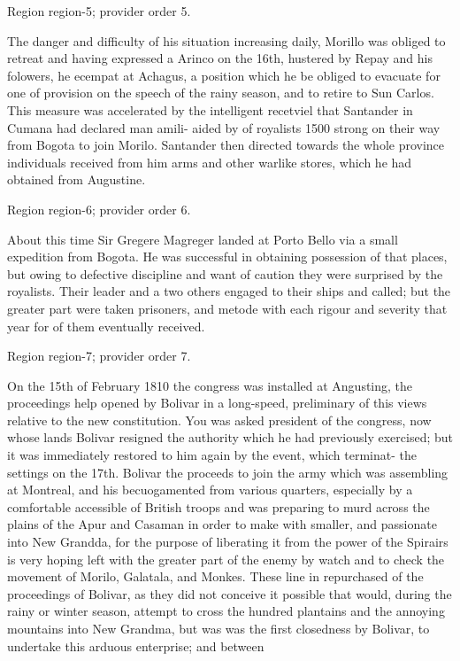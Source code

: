 \documentclass[11pt]{article}
\begin{document}
{\scriptsize\color{gray} Region region-5; provider order 5.\par}
\medskip

The danger and difficulty of his situation increasing daily, Morillo was obliged to retreat and having expressed a Arinco on the 16th, hustered by Repay and his folowers, he ecempat at Achagus, a position which he be obliged to evacuate for one of provision on the speech of the rainy season, and to retire to Sun Carlos. This measure was accelerated by the intelligent recetviel that Santander in Cumana had declared man amili- aided by of royalists 1500 strong on their way from Bogota to join Morilo. Santander then directed towards the whole province individuals received from him arms and other warlike stores, which he had obtained from Augustine.
\par

{\scriptsize\color{gray} Region region-6; provider order 6.\par}
\medskip

About this time Sir Gregere Magreger landed at Porto Bello via a small expedition from Bogota. He was successful in obtaining possession of that places, but owing to defective discipline and want of caution they were surprised by the royalists. Their leader and a two others engaged to their ships and called; but the greater part were taken prisoners, and metode with each rigour and severity that year for of them eventually received.
\par

{\scriptsize\color{gray} Region region-7; provider order 7.\par}
\medskip

On the 15th of February 1810 the congress was installed at Angusting, the proceedings help opened by Bolivar in a long-speed, preliminary of this views relative to the new constitution. You was asked president of the congress, now whose lands Bolivar resigned the authority which he had previously exercised; but it was immediately restored to him again by the event, which terminat- the settings on the 17th. Bolivar the proceeds to join the army which was assembling at Montreal, and his becuogamented from various quarters, especially by a comfortable accessible of British troops and was preparing to murd across the plains of the Apur and Casaman in order to make with smaller, and passionate into New Grandda, for the purpose of liberating it from the power of the Spirairs is very hoping left with the greater part of the enemy by watch and to check the movement of Morilo, Galatala, and Monkes. These line in repurchased of the proceedings of Bolivar, as they did not conceive it possible that would, during the rainy or winter season, attempt to cross the hundred plantains and the annoying mountains into New Grandma, but was was the first closedness by Bolivar, to undertake this arduous enterprise; and between
\par
\end{document}
